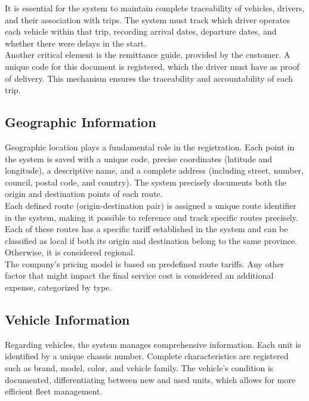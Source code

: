 \documentclass[11pt, a4paper]{article}
\begin{document}
It is essential for the system to maintain complete traceability of vehicles, drivers, and their association with trips. The system must track which driver operates each vehicle within that trip, recording arrival dates, departure dates, and whether there were delays in the start.\\

Another critical element is the remittance guide, provided by the customer. A unique code for this document is registered, which the driver must have as proof of delivery. This mechanism ensures the traceability and accountability of each trip.\\

\subsection{Geographic Information}
Geographic location plays a fundamental role in the registration. Each point in the system is saved with a unique code, precise coordinates (latitude and longitude), a descriptive name, and a complete address (including street, number, council, postal code, and country). The system precisely documents both the origin and destination points of each route.\\

Each defined route (origin-destination pair) is assigned a unique route identifier in the system, making it possible to reference and track specific routes precisely. Each of these routes has a specific tariff established in the system and can be classified as local if both its origin and destination belong to the same province. Otherwise, it is considered regional.\\

The company's pricing model is based on predefined route tariffs. Any other factor that might impact the final service cost is considered an additional expense, categorized by type.\\

\subsection{Vehicle Information}
Regarding vehicles, the system manages comprehensive information. Each unit is identified by a unique chassis number. Complete characteristics are registered such as brand, model, color, and vehicle family. The vehicle's condition is documented, differentiating between new and used units, which allows for more efficient fleet management.\\
\end{document}
